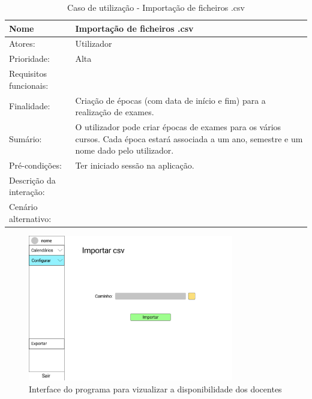 \documentclass[11pt, twoside]{report}
\begin{document}
\begin{table}[H]
	\caption{Caso de utilização - Importação de ficheiros .csv}
	\begin{center}	
		\begin{tabularx}{\textwidth}{|l|X|}
			\hline
			\textbf{Nome }	& \textbf{Importação de ficheiros .csv} \\
			\hline
			Atores: & Utilizador\\
			\hline
			Prioridade: &  Alta\\
			\hline
			Requisitos funcionais:&  \\
			\hline
			Finalidade: & Criação de épocas (com data de início e fim) para a realização de exames. \\
			\hline
			Sumário: & O utilizador pode criar épocas de exames para os vários cursos. Cada época estará associada a um ano, semestre e um nome dado pelo utilizador.\\
			\hline
			Pré-condições: & Ter iniciado sessão na aplicação.\\
			\hline
			Descrição da interação: &  \\
			\hline
			Cenário alternativo: &\\
			\hline
		\end{tabularx}
	\end{center}
\end{table}


\begin{figure}[H] 
	\centering 
	\includegraphics[width=0.8\textwidth,height=0.8\textheight,keepaspectratio]{image/prototipowireframes/importar}
	\caption{Interface do programa para vizualizar a disponibilidade dos docentes}
\end{figure}
\end{document}
